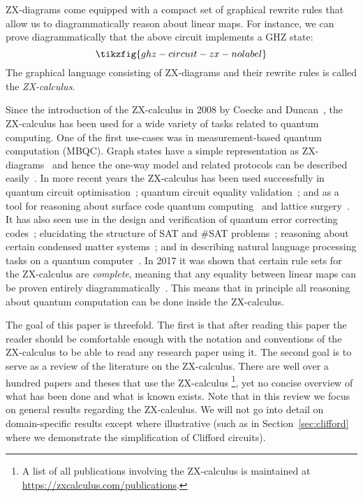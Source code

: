 \documentclass[a4paper,onecolumn,superscriptaddress,11pt,%
				unpublished,%
				allowfontchageintitle,%
				]{quantumarticle}
\begin{document}
ZX-diagrams come equipped with a compact set of graphical rewrite rules that allow us to diagrammatically reason about linear maps. For instance, we can prove diagrammatically that the above circuit implements a GHZ state:
\begin{equation*}
\tikzfig{ghz-circuit-zx-nolabel}
\end{equation*}
The graphical language consisting of ZX-diagrams and their rewrite rules is called the \emph{ZX-calculus}. 

Since the introduction of the ZX-calculus in 2008 by Coecke and Duncan~\cite{CD1,CD2}, the ZX-calculus has been used for a wide variety of tasks related to quantum computing.
One of the first use-cases was in measurement-based quantum computation (MBQC).
Graph states have a simple representation as ZX-diagrams~\cite{DP2} and hence the one-way model and related protocols can be described easily~\cite{kissinger2017MBQC,wetering-gflow}. 
In more recent years the ZX-calculus has been used successfully in quantum circuit optimisation~\cite{cliffsimp,deBeaudrap2020Techniques,kissinger2019tcount,phaseGadgetSynth}; quantum circuit equality validation~\cite{kissinger2019tcount,Lemonnier2020hypergraph}; and as a tool for reasoning about surface code quantum computing~\cite{horsman2011quantum} and lattice surgery~\cite{deBeaudrap2020Paulifusion,Gidney2019efficientmagicstate,horsman2017surgery,hanks2019effective}. 
It has also seen use in the design and verification of quantum error correcting codes~\cite{chancellor2016coherent,duncan2013verifying,EPTCS266.10,SZXCalculus}; elucidating the structure of SAT and \#SAT problems~\cite{debeaudrap2020tensor}; reasoning about certain condensed matter systems~\cite{east2020akltstates}; and in describing natural language processing tasks on a quantum computer~\cite{coecke2020foundations}.
In 2017 it was shown that certain rule sets for the ZX-calculus are \emph{complete}, meaning that any equality between linear maps can be proven entirely diagrammatically~\cite{HarnyCompleteness,SimonCompleteness,HarnyAmarCompleteness}. This means that in principle all reasoning about quantum computation can be done inside the ZX-calculus.

The goal of this paper is threefold.
The first is that after reading this paper the reader should be comfortable enough with the notation and conventions of the ZX-calculus to be able to read any research paper using it. The second goal is to serve as a review of the literature on the ZX-calculus. 
There are well over a hundred papers and theses that use the ZX-calculus%
\footnote{A list of all publications involving the ZX-calculus is maintained at \url{https://zxcalculus.com/publications}.}, 
yet no concise overview of what has been done and what is known exists.
Note that in this review we focus on general results regarding the ZX-calculus. We will not go into detail on domain-specific results except where illustrative (such as in Section~\ref{sec:clifford} where we demonstrate the simplification of Clifford circuits).
\end{document}
